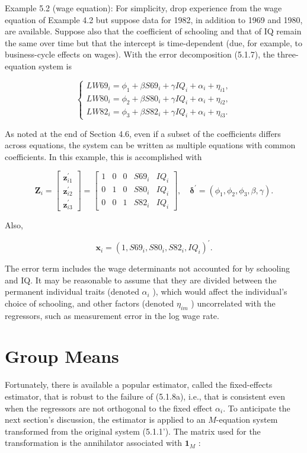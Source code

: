 \documentclass[10pt]{article}
\begin{document}
Example 5.2 (wage equation): For simplicity, drop experience from the wage equation of Example 4.2 but suppose data for 1982, in addition to 1969 and 1980, are available. Suppose also that the coefficient of schooling and that of IQ remain the same over time but that the intercept is time-dependent (due, for example, to business-cycle effects on wages). With the error decomposition (5.1.7), the three-equation system is

$$
\left\{\begin{array}{l}
L W 69_{i}=\phi_{1}+\beta S 69_{i}+\gamma I Q_{i}+\alpha_{i}+\eta_{i 1}, \\
L W 80_{i}=\phi_{2}+\beta S 80_{i}+\gamma I Q_{i}+\alpha_{i}+\eta_{i 2}, \\
L W 82_{i}=\phi_{3}+\beta S 82_{i}+\gamma I Q_{i}+\alpha_{i}+\eta_{i 3} .
\end{array}\right.
$$

As noted at the end of Section 4.6, even if a subset of the coefficients differs across equations, the system can be written as multiple equations with common coefficients. In this example, this is accomplished with

\[
\mathbf{Z}_{i}=\left[\begin{array}{c}
\mathbf{z}_{i 1}^{\prime}  \tag{5.1.9}\\
\mathbf{z}_{i 2}^{\prime} \\
\mathbf{z}_{i 3}^{\prime}
\end{array}\right]=\left[\begin{array}{ccccc}
1 & 0 & 0 & S 69_{i} & I Q_{i} \\
0 & 1 & 0 & S 80_{i} & I Q_{i} \\
0 & 0 & 1 & S 82_{i} & I Q_{i}
\end{array}\right], \quad \boldsymbol{\delta}^{\prime}=\left(\phi_{1}, \phi_{2}, \phi_{3}, \beta, \gamma\right) .
\]

Also,

$$
\mathbf{x}_{i}=\left(1, S 69_{i}, S 80_{i}, S 82_{i}, I Q_{i}\right)^{\prime} .
$$

The error term includes the wage determinants not accounted for by schooling and IQ. It may be reasonable to assume that they are divided between the permanent individual traits (denoted $\alpha_{i}$ ), which would affect the individual's choice of schooling, and other factors (denoted $\eta_{i m}$ ) uncorrelated with the regressors, such as measurement error in the log wage rate.

\section*{Group Means}
Fortunately, there is available a popular estimator, called the fixed-effects estimator, that is robust to the failure of (5.1.8a), i.e., that is consistent even when the regressors are not orthogonal to the fixed effect $\alpha_{i}$. To anticipate the next section's discussion, the estimator is applied to an $M$-equation system transformed from the original system (5.1.1'). The matrix used for the transformation is the annihilator associated with $\mathbf{1}_{M}$ :
\end{document}
